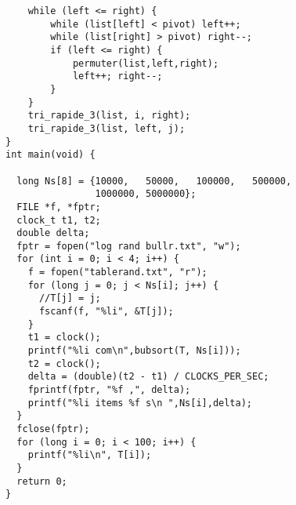 \begin{verbatim}
    while (left <= right) {
        while (list[left] < pivot) left++;
        while (list[right] > pivot) right--;
        if (left <= right) {
            permuter(list,left,right);
            left++; right--;
        }
    }
    tri_rapide_3(list, i, right);
    tri_rapide_3(list, left, j);
}
int main(void) {
  
  long Ns[8] = {10000,   50000,   100000,   500000,
                1000000, 5000000};
  FILE *f, *fptr;
  clock_t t1, t2;
  double delta;
  fptr = fopen("log rand bullr.txt", "w");
  for (int i = 0; i < 4; i++) {
    f = fopen("tablerand.txt", "r");
    for (long j = 0; j < Ns[i]; j++) {
      //T[j] = j;
      fscanf(f, "%li", &T[j]);
    }
    t1 = clock();
    printf("%li com\n",bubsort(T, Ns[i]));
    t2 = clock();
    delta = (double)(t2 - t1) / CLOCKS_PER_SEC;
    fprintf(fptr, "%f ,", delta);
    printf("%li items %f s\n ",Ns[i],delta);
  }
  fclose(fptr);
  for (long i = 0; i < 100; i++) {
    printf("%li\n", T[i]);
  }
  return 0;
}


\end{verbatim}